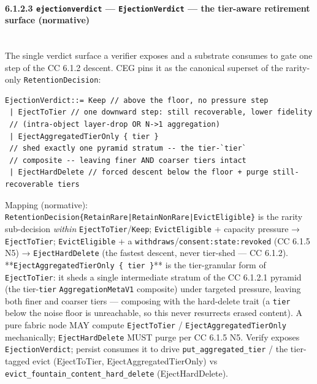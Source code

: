 \documentclass[11pt]{article}
\begin{document}
\paragraph{6.1.2.3 \texttt{ejectionverdict} — \texttt{EjectionVerdict} — the tier-aware retirement surface (normative)}\mbox{}\\


The single verdict surface a verifier exposes and a substrate consumes to gate one step of the CC 6.1.2 descent. CEG pins it as the canonical superset of the rarity-only \texttt{RetentionDecision}:


\begin{lstlisting}
EjectionVerdict::= Keep // above the floor, no pressure step
 | EjectToTier // one downward step: still recoverable, lower fidelity
 // (intra-object layer-drop OR N->1 aggregation)
 | EjectAggregatedTierOnly { tier }
 // shed exactly one pyramid stratum -- the tier-`tier`
 // composite -- leaving finer AND coarser tiers intact
 | EjectHardDelete // forced descent below the floor + purge still-recoverable tiers
\end{lstlisting}

Mapping (normative): \texttt{RetentionDecision\{RetainRare|RetainNonRare|EvictEligible\}} is the rarity sub-decision \textit{within} \texttt{EjectToTier}/\texttt{Keep}; \texttt{EvictEligible} + capacity pressure → \texttt{EjectToTier}; \texttt{EvictEligible} + a \texttt{withdraws}/\texttt{consent:state:revoked} (CC 6.1.5 N5) → \texttt{EjectHardDelete} (the fastest descent, never tier-shed — CC 6.1.2). **\texttt{EjectAggregatedTierOnly \{ tier \}}** is the tier-granular form of \texttt{EjectToTier}: it sheds a single intermediate stratum of the CC 6.1.2.1 pyramid (the tier-\texttt{tier} \texttt{AggregationMetaV1} composite) under targeted pressure, leaving both finer and coarser tiers — composing with the hard-delete trait (a \texttt{tier} below the noise floor is unreachable, so this never resurrects erased content). A pure fabric node MAY compute \texttt{EjectToTier} / \texttt{EjectAggregatedTierOnly} mechanically; \texttt{EjectHardDelete} MUST purge per CC 6.1.5 N5. Verify exposes \texttt{EjectionVerdict}; persist consumes it to drive \texttt{put\_aggregated\_tier} / the tier-tagged evict (EjectToTier, EjectAggregatedTierOnly) vs \texttt{evict\_fountain\_content\_hard\_delete} (EjectHardDelete).
\end{document}
